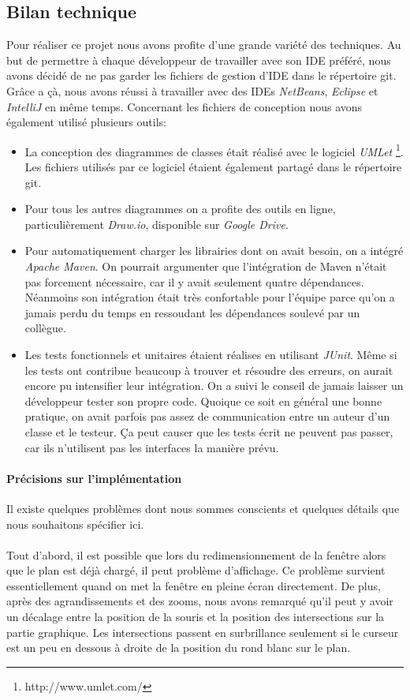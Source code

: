 \documentclass[10pt,a4paper]{book}
\begin{document}
\subsection{Bilan technique}
Pour réaliser ce projet nous avons profite d'une grande variété des techniques. Au but de permettre à chaque développeur de travailler avec son IDE préféré, nous avons décidé de ne pas garder les fichiers de gestion d'IDE dans le répertoire git. Grâce a çà, nous avons réussi à travailler avec des IDEs \textit{NetBeans}, \textit{Eclipse} et \textit{IntelliJ} en même temps. Concernant les fichiers de conception nous avons également utilisé plusieurs outils:
\begin{itemize}
	\item{La conception des diagrammes de classes était réalisé avec le logiciel \textit{UMLet} \footnote{http://www.umlet.com/}. Les fichiers utilisés par ce logiciel étaient également partagé dans le répertoire git.}
	\item{Pour tous les autres diagrammes on a profite des outils en ligne, particulièrement \textit{Draw.io}, disponible sur \textit{Google Drive}.}
	\item{Pour automatiquement charger les librairies dont on avait besoin, on a intégré \textit{Apache Maven}. On pourrait argumenter que l'intégration de Maven n'était pas forcement nécessaire, car il y avait seulement quatre dépendances. Néanmoins son intégration était très confortable pour l'équipe parce qu'on a jamais perdu du temps en ressoudant les dépendances soulevé par un collègue.}
	\item{Les tests fonctionnels et unitaires étaient réalises en utilisant \textit{JUnit}. Même si les tests ont contribue beaucoup à trouver et résoudre des erreurs, on aurait encore pu intensifier leur intégration. On a suivi le conseil de jamais laisser un développeur tester son propre code. Quoique ce soit en général une bonne pratique, on avait parfois pas assez de communication entre un auteur d'un classe et le testeur. Ça peut causer que les tests écrit ne peuvent pas passer, car ils n'utilisent pas les interfaces la manière prévu.}
\end{itemize}
\paragraph{Précisions sur l'implémentation}
Il existe quelques problèmes dont nous sommes conscients et quelques détails que nous souhaitons spécifier ici.
\paragraph{}
Tout d'abord, il est possible que lors du redimensionnement de la fenêtre alors que le plan est déjà chargé, il peut problème d'affichage. Ce problème survient essentiellement quand on met la fenêtre en pleine écran directement. De plus, après des agrandissements et des zooms, nous avons remarqué qu'il peut y avoir un décalage entre la position de la souris et la position des intersections sur la partie graphique. Les intersections passent en surbrillance seulement si le curseur est un peu en dessous à droite de la position du rond blanc sur le plan.
\end{document}
